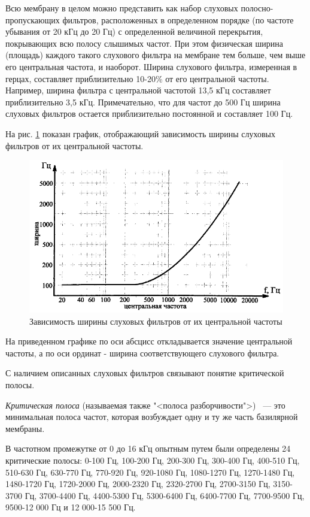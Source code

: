 \documentclass[oneside, final, 14pt]{extreport}
\begin{document}
Всю мембрану в целом можно представить как набор слуховых полосно-пропускающих фильтров, расположенных в определенном порядке (по частоте убывания от 20 кГц до 20 Гц) с определенной величиной перекрытия, покрывающих всю полосу слышимых частот. При этом физическая ширина (площадь) каждого такого слухового фильтра на мембране тем больше, чем выше его центральная частота, и наоборот. Ширина слухового фильтра, измеренная в герцах, составляет приблизительно 10-20\% от его центральной частоты. Например, ширина фильтра с центральной частотой 13,5 кГц
составляет приблизительно 3,5 кГц. Примечательно, что для частот до 500 Гц ширина слуховых фильтров остается приблизительно постоянной и составляет 100 Гц.

На рис. \ref{pic-ear-03} показан график, отображающий зависимость ширины слуховых
фильтров от их центральной частоты.

\begin{figure}[h]
\centering
\includegraphics[width=0.9\linewidth]{pic-ear-03}
\caption{Зависимость ширины слуховых фильтров от их центральной частоты}
\label{pic-ear-03}
\end{figure}

На приведенном графике по оси абсцисс откладывается значение центральной частоты, а по оси ординат - ширина соответствующего слухового фильтра.

С наличием описанных слуховых фильтров связывают понятие критической полосы. 

{\itshape Критическая полоса} (называемая также "<полоса разборчивости">) ~--- это минимальная полоса частот, которая возбуждает одну и ту же часть базилярной мембраны. 

В частотном промежутке от 0 до 16 кГц опытным путем были определены 24 критические полосы: 0-100 Гц, 100-200 Гц, 200-300 Гц, 300-400 Гц, 400-510 Гц, 510-630 Гц, 630-770 Гц, 770-920 Гц, 920-1080 Гц, 1080-1270 Гц, 1270-1480 Гц, 1480-1720 Гц, 1720-2000 Гц, 2000-2320 Гц, 2320-2700 Гц, 2700-3150 Гц, 3150-3700 Гц, 3700-4400 Гц, 4400-5300 Гц, 5300-6400 Гц, 6400-7700 Гц, 7700-9500 Гц, 9500-12 000 Гц и 12 000-15 500 Гц.
\end{document}

